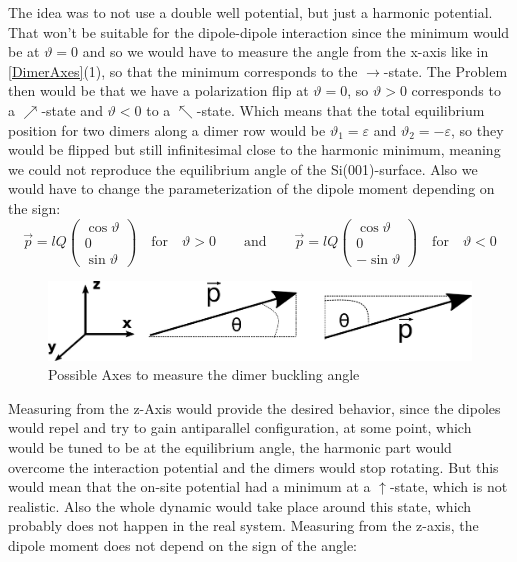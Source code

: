 	The idea was to not use a double well potential, but just a harmonic potential. That won't be suitable for the dipole-dipole interaction since the minimum would be at $\vartheta = 0$ and so we would have to measure the angle from the x-axis like in \autoref{DimerAxes}(1), so that the minimum corresponds to the $\rightarrow$-state. The Problem then would be that we have a polarization flip at $\vartheta = 0$, so $\vartheta > 0$ corresponds to a $\nearrow$-state and $\vartheta < 0$ to a $\nwarrow$-state. Which means that the total equilibrium position for two dimers along a dimer row would be $\vartheta_1 =	\varepsilon$ and $\vartheta_2 =	- \varepsilon$, so they would be flipped but still infinitesimal close to the harmonic minimum, meaning we could not reproduce the equilibrium angle of the Si(001)-surface. Also we would have to change the parameterization of the dipole moment depending on the sign:
	\begin{equation}
		\vec{p} =	l  Q \left(\begin{array}{c}
			\cos \vartheta \\
			0 \\
			\sin \vartheta
		\end{array} \right) \quad \text{for} \quad \vartheta > 0 \qquad \text{and} \qquad \vec{p} = l  Q	\left(\begin{array}{c}
			\cos \vartheta \\
			0 \\
			- \sin \vartheta
		\end{array} \right) \quad \text{for} \quad \vartheta < 0
	\end{equation}
	\begin{figure}[htp]
		\centering
		\includegraphics[width=0.8\linewidth]{graphics/DimerAngleParameterization.png}
		\caption{Possible Axes to measure the dimer buckling angle}
		\label{DimerAxes}
	\end{figure}
	Measuring from the z-Axis would provide the desired behavior, since the dipoles would repel and try to gain antiparallel configuration, at some point, which would be tuned to be at the equilibrium angle, the harmonic part would overcome the interaction potential and the dimers would stop rotating. But this would mean that the on-site potential had a minimum at a $\uparrow$-state, which is not realistic. Also the whole dynamic would take place around this state, which probably does not happen in the real system. Measuring from the z-axis, the dipole moment does not depend on the sign of the angle:

